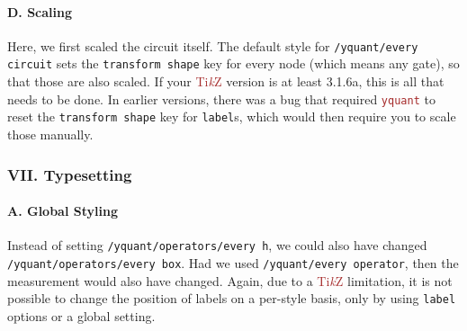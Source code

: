\documentclass{scrartcl}
\makeatletter
\newenvironment{codeexample*}{%
   \VerbatimEnvironment%
   \let\FVB@VerbatimOut\minted@FVB@VerbatimOut
   \let\FVE@VerbatimOut\minted@FVE@VerbatimOut
   \minted@configlang{tex}%
   \minted@fvset
   \begin{VerbatimOut}[codes={\catcode`\^^I=12},firstline,lastline]{\minted@jobname.pyg}%
}{
   \end{VerbatimOut}%
   \minted@langlinenoson%
   \begin{adjustbox}{center}
       \minted@jobname.pyg %
   \end{adjustbox}\nopagebreak
   \expandafter\minted@pygmentize\expandafter{\minted@lang}%
   \minted@langlinenosoff%
   \par%
}
\def\TikZ{\textcolor{brown}{Ti\textit kZ}}
\def\pkg#1{\textcolor{brown}{\texttt{#1}}}
\def\ttlink{\link\texttt}
\def\Yquant{\pkg{yquant}}
\makeatother
\begin{document}
            \paragraph{D. Scaling}\leavevmode
               \begin{example}
                  \begin{codeexample*}
                  \end{codeexample*}
                  Here, we first scaled the circuit itself.
                  The default style for \ttlink{/yquant/every circuit} sets the \texttt{transform shape} key for every node (which means any gate), so that those are also scaled.
                  If your \TikZ{} version is at least 3.1.6a, this is all that needs to be done.
                  In earlier versions, there was a bug that required \Yquant{} to reset the \texttt{transform shape} key for \texttt{label}s, which would then require you to scale those manually.
               \end{example}

         \clearpage
         \subsubsection{VII. Typesetting}
            \paragraph{A. Global Styling}\leavevmode
               \begin{example}
                  \begin{codeexample*}
                  \end{codeexample*}
                  Instead of setting \ttlink{/yquant/operators/every h}, we could also have changed \ttlink{/yquant/operators/every box}.
                  Had we used \ttlink{/yquant/every operator}, then the measurement would also have changed.
                  Again, due to a \TikZ{} limitation, it is not possible to change the position of labels on a per\hyp style basis, only by using \texttt{label} options or a global setting.
               \end{example}
\end{document}
